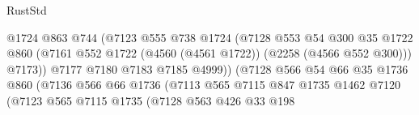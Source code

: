 \begin{lexlean}{RustStd}
\begin{coremodule}
                                          @1724
                                          @863
                                          @744
                                          (@7123
                                            @555
                                            @738
                                            @1724
                                            (@7128
                                              @553
                                              @54
                                              @300
                                              @35
                                              @1722
                                              @860
                                              (@7161
                                                @552
                                                @1722
                                                (@4560 (@4561 @1722))
                                                (@2258 (@4566 @552 @300)))
                                              @7173))
                                          @7177
                                          @7180
                                          @7183
                                          @7185
                                          @4999))
                                      (@7128
                                        @566
                                        @54
                                        @66
                                        @35
                                        @1736
                                        @860
                                        (@7136
                                          @566
                                          @66
                                          @1736
                                          (@7113
                                            @565
                                            @7115
                                            @847
                                            @1735
                                            @1462
                                            @7120
                                            (@7123
                                              @565
                                              @7115
                                              @1735
                                              (@7128
                                                @563
                                                @426
                                                @33
                                                @198

\end{coremodule}
\end{lexlean}
